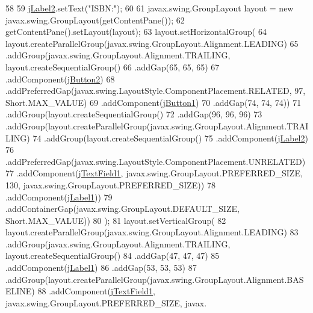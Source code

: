 \begin{DoxyCode}
58 
59         \mbox{\hyperlink{class_interfaz_package_1_1_baja_libro_a6338f6b6d9f81c8b561ffeaa3e70b42d}{jLabel2}}.setText(\textcolor{stringliteral}{"ISBN:"});
60 
61         javax.swing.GroupLayout layout = \textcolor{keyword}{new} javax.swing.GroupLayout(getContentPane());
62         getContentPane().setLayout(layout);
63         layout.setHorizontalGroup(
64             layout.createParallelGroup(javax.swing.GroupLayout.Alignment.LEADING)
65             .addGroup(javax.swing.GroupLayout.Alignment.TRAILING, layout.createSequentialGroup()
66                 .addGap(65, 65, 65)
67                 .addComponent(\mbox{\hyperlink{class_interfaz_package_1_1_baja_libro_a2da0b911c31a5ee87f05b4a630fa5b2d}{jButton2}})
68                 .addPreferredGap(javax.swing.LayoutStyle.ComponentPlacement.RELATED, 97, Short.MAX\_VALUE)
69                 .addComponent(\mbox{\hyperlink{class_interfaz_package_1_1_baja_libro_ad62adfcc532334f669bfaf40af59fa81}{jButton1}})
70                 .addGap(74, 74, 74))
71             .addGroup(layout.createSequentialGroup()
72                 .addGap(96, 96, 96)
73                 .addGroup(layout.createParallelGroup(javax.swing.GroupLayout.Alignment.TRAILING)
74                     .addGroup(layout.createSequentialGroup()
75                         .addComponent(\mbox{\hyperlink{class_interfaz_package_1_1_baja_libro_a6338f6b6d9f81c8b561ffeaa3e70b42d}{jLabel2}})
76                         .addPreferredGap(javax.swing.LayoutStyle.ComponentPlacement.UNRELATED)
77                         .addComponent(\mbox{\hyperlink{class_interfaz_package_1_1_baja_libro_a2b033ca044fbf57e3ee123d55b137e31}{jTextField1}}, javax.swing.GroupLayout.PREFERRED\_SIZE, 130, 
      javax.swing.GroupLayout.PREFERRED\_SIZE))
78                     .addComponent(\mbox{\hyperlink{class_interfaz_package_1_1_baja_libro_ae5a57149ebdb3f8259cd7f0bee7684c4}{jLabel1}}))
79                 .addContainerGap(javax.swing.GroupLayout.DEFAULT\_SIZE, Short.MAX\_VALUE))
80         );
81         layout.setVerticalGroup(
82             layout.createParallelGroup(javax.swing.GroupLayout.Alignment.LEADING)
83             .addGroup(javax.swing.GroupLayout.Alignment.TRAILING, layout.createSequentialGroup()
84                 .addGap(47, 47, 47)
85                 .addComponent(\mbox{\hyperlink{class_interfaz_package_1_1_baja_libro_ae5a57149ebdb3f8259cd7f0bee7684c4}{jLabel1}})
86                 .addGap(53, 53, 53)
87                 .addGroup(layout.createParallelGroup(javax.swing.GroupLayout.Alignment.BASELINE)
88                     .addComponent(\mbox{\hyperlink{class_interfaz_package_1_1_baja_libro_a2b033ca044fbf57e3ee123d55b137e31}{jTextField1}}, javax.swing.GroupLayout.PREFERRED\_SIZE, javax.

\end{DoxyCode}
